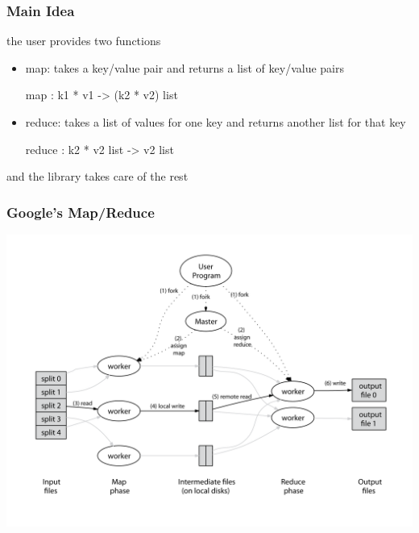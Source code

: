 \documentclass{beamer}
\let\emph\alert
\begin{document}
\begin{frame}\frametitle{Main Idea}
  the user provides two functions
  \begin{itemize}
  \item \emph{map}: takes a key/value pair and returns a list of key/value
    pairs
    \begin{ocaml}
    map : k1 * v1 -> (k2 * v2) list
    \end{ocaml}



  \item \emph{reduce}: takes a list of values for one key and returns
    another list for that key
    \begin{ocaml}
    reduce : k2 * v2 list -> v2 list
    \end{ocaml}
  \end{itemize}



  and the library takes care of the rest
\end{frame}


\begin{frame}\frametitle{Google's Map/Reduce}
  \begin{center}
    \includegraphics[width=\textwidth]{mrfigure}
  \end{center}
\end{frame}
\end{document}
